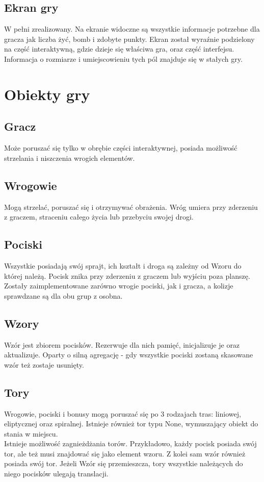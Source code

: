 \documentclass[a4paper,twoside]{article}
\begin{document}
			\subsection{Ekran gry}
				W pełni zrealizowany. Na ekranie widoczne są wszystkie informacje potrzebne dla gracza jak liczba żyć, bomb i zdobyte punkty. Ekran został wyraźnie podzielony na część interaktywną, gdzie dzieje się właściwa gra, oraz część interfejsu. Informacja o rozmiarze i umiejscowieniu tych pól znajduje się w stałych gry.
		\section{Obiekty gry}
			\subsection{Gracz}
				Może poruszać się tylko w obrębie części interaktywnej, posiada możliwość strzelania i niszczenia wrogich elementów.
			\subsection{Wrogowie}
				Mogą strzelać, poruszać się i otrzymywać obrażenia. Wróg umiera przy zderzeniu z graczem, straceniu całego życia lub przebyciu swojej drogi.
			\subsection{Pociski}
				Wszystkie posiadają swój sprajt, ich kształt i droga są zależny od Wzoru do której należą. Pocisk znika przy zderzeniu z graczem lub wyjściu poza planszę. Zostały zaimplementowane zarówno wrogie pociski, jak i gracza, a kolizje sprawdzane są dla obu grup z osobna.
			\subsection{Wzory}
				Wzór jest zbiorem pocisków. Rezerwuje dla nich pamięć, inicjalizuje je oraz aktualizuje. Oparty o silną agregację - gdy wszystkie pociski zostaną skasowane wzór też zostaje usunięty.
			\subsection{Tory}
				Wrogowie, pociski i bonusy mogą poruszać się po 3 rodzajach tras: liniowej, eliptycznej oraz spiralnej. Istnieje również tor typu None, wymuszający obiekt do stania w miejscu.\\
				Istnieje możliwość zagnieżdżania torów. Przykładowo, każdy pocisk posiada swój tor, ale też musi znajdować się jako element wzoru. Z kolei sam wzór również posiada swój tor. Jeżeli Wzór się przemieszcza, tory wszystkie należących do niego pocisków ulegają translacji.
\end{document}
